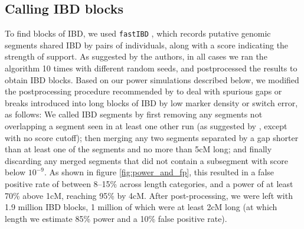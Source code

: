 \documentclass{article}
\begin{document}
\subsection{Calling IBD blocks}

To find blocks of IBD, we used {\tt fastIBD} \citep[implemented in BEAGLE,][]{browning2011powerful},
which records putative genomic segments shared IBD by pairs of individuals, along with a score indicating the strength of support.
As suggested by the authors, in all cases we ran the algorithm 10 times with different random seeds, 
and postprocessed the results to obtain IBD blocks.
Based on our power simulations described below, 
we modified the postprocessing procedure recommended by \citet{browning2011powerful} 
to deal with spurious gaps or breaks introduced into long blocks of IBD by low marker density or switch error, as follows:  
We called IBD segments by first removing any segments not overlapping a segment seen in at least one other run
(as suggested by \citet{browning2011powerful}, except with no score cutoff); 
then merging any two segments separated by a gap shorter than at least one of the segments and no more than 5cM long;
and finally discarding any merged segments that did not contain a subsegment with score below $10^{-9}$.
As shown in figure \ref{fig:power_and_fp}, 
this resulted in a false positive rate of between 8--15\% across length categories,
and a power of at least 70\% above 1cM, reaching 95\% by 4cM.
After post-processing, we were left with 1.9 million IBD blocks,
1 million of which were at least 2cM long (at which length we estimate 85\% power and a 10\% false positive rate).  
\end{document}
